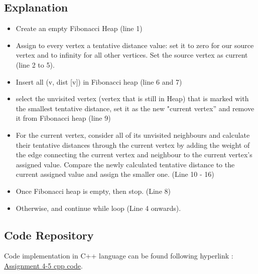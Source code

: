 \documentclass{article}
\begin{document}
\subsection{Explanation}
\begin{itemize}
\item Create an empty Fibonacci Heap (line 1)
\item	Assign to every vertex a tentative distance value: set it to zero for our source vertex and to infinity for all other vertices. Set the source vertex as current (line 2 to 5).
\item	Insert all (v, dist [v]) in Fibonacci heap (line 6 and 7)
\item	select the unvisited vertex (vertex that is still in Heap) that is marked with the smallest tentative distance, set it as the new "current vertex” and remove it from Fibonacci heap (line 9)
\item	For the current vertex, consider all of its unvisited neighbours and calculate their tentative distances through the current vertex by adding the weight of the edge connecting the current vertex and neighbour to the current vertex's assigned value. Compare the newly calculated tentative distance to the current assigned value and assign the smaller one. (Line 10 - 16)
\item	Once Fibonacci heap is empty, then stop. (Line 8)
\item	Otherwise, and continue while loop (Line 4 onwards). 

\end{itemize}
\subsection{Code Repository}
Code implementation in C++ language can be found following hyperlink :  \href{https://github.com/mohit83k/iiti_ms_assignments/blob/main/advancedalgo/4-5/dijkstra.cpp}{Assignment 4-5 cpp code}.
\end{document}
